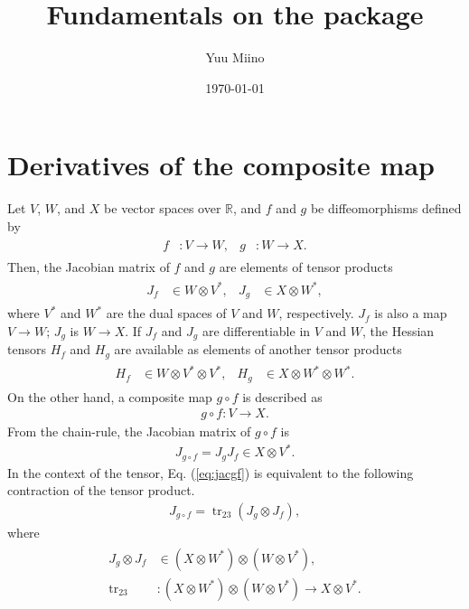 \documentclass[a4paper]{article}
\title{Fundamentals on the package}
\author{Yuu Miino}
\date{\today}
\newcommand{\R}{\mathbb{R}}
\newcommand{\jac}{J}
\newcommand{\hes}{H}
\newcommand{\parens}[1]{\left(#1\right)}
\newcommand{\tr}{\mathop{\mathrm{tr}}\nolimits}
\begin{document}
\maketitle
\section{Derivatives of the composite map}
Let $V$, $W$, and $X$ be vector spaces over $\R$,
and $f$ and $g$ be diffeomorphisms defined by
\begin{align}
    \begin{aligned}
        f&: V \to W, &
        g&: W \to X.
    \end{aligned}
\end{align}
Then, the Jacobian matrix of $f$ and $g$ are elements of tensor products
\begin{align}
    \begin{aligned}
        \jac_f &\in W \otimes V^*, &
        \jac_g &\in X \otimes W^*,
    \end{aligned}
\end{align}
where $V^*$ and $W^*$ are the dual spaces of $V$ and $W$, respectively.
$\jac_f$ is also a map $V \to W$; $\jac_g$ is $W \to X$.
If $\jac_f$ and $\jac_g$ are differentiable in $V$ and $W$,
the Hessian tensors $\hes_f$ and $\hes_g$ are available as elements of another tensor products
\begin{align}
    \begin{aligned}
        \hes_f &\in W \otimes V^* \otimes V^*, &
        \hes_g &\in X \otimes W^* \otimes W^*.
    \end{aligned}
\end{align}
On the other hand, a composite map $g\circ f$ is described as
\begin{align}
    g \circ f: V \to X.
\end{align}
From the chain-rule, the Jacobian matrix of $g\circ f$ is
\begin{align}
    \jac_{g\circ f} = \jac_g \jac_f \in X \otimes V^*.
    \label{eq:jacgf}
\end{align}
In the context of the tensor, Eq. (\ref{eq:jacgf}) is equivalent to
the following contraction of the tensor product.
\begin{align}
    \jac_{g\circ f} = \tr_{23} \parens{
        \jac_g \otimes \jac_f
    },
\end{align}
where
\begin{align}
    \begin{aligned}
        \jac_g \otimes \jac_f &\in \parens{X \otimes W^*} \otimes \parens{W \otimes V^*}, \\
        \tr_{23} & : \parens{X \otimes W^*} \otimes \parens{W \otimes V^*} \to
        X \otimes V^*.
    \end{aligned}
\end{align}
\end{document}
